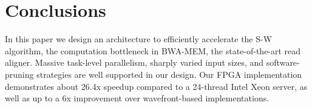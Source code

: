\section{Conclusions} 
\label{sec:conclusions}
In this paper we design an architecture to efficiently accelerate the S-W algorithm, the computation bottleneck in BWA-MEM, the state-of-the-art read aligner. 
Massive task-level parallelism, sharply varied input sizes, and software-pruning strategies are well supported in our design. 
Our FPGA implementation demonstrates about 26.4x speedup compared to a 24-thread Intel Xeon server, as well as up to a 6x improvement over wavefront-based implementations. 


\vspace{-5pt}
